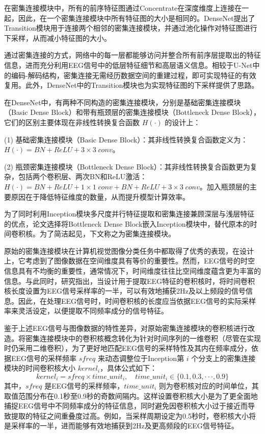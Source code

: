 在密集连接模块中，所有的前序特征图通过Concentrate在深度维度上连接在一起，因此，在一个密集连接模块中所有特征图的大小是相同的。DenseNet提出了Transition模块用于连接两个相邻的密集连接模块，并通过池化操作对特征图进行下采样，从而减小特征图的大小。

通过密集连接的方式，网络中的每一层都能够访问并整合所有前序层提取出的特征信息，进而充分利用EEG信号中的低层特征细节和高层语义信息。相较于U-Net中的编码-解码结构，密集连接无需经历数据空间的重建过程，即可实现特征的有效复用。此外，DenseNet中的Transition模块也为实现特征图的下采样提供了思路。

在DenseNet中，有两种不同构造的密集连接模块，分别是基础密集连接模块（Basic Dense Block）和带有瓶颈层的密集连接模块（Bottleneck Dense Block），它们的区别主要体现在非线性转换复合函数 \(H(·)\) 的设计上：

(1) 基础密集连接模块（Basic Dense Block）：其非线性转换复合函数定义为： \(H(·) = BN + ReLU + 3 \times 3\;conv\)。

(2) 瓶颈密集连接模块（Bottleneck Dense Block）：其非线性转换复合函数更为复杂，包括两个卷积层、两次BN和ReLU激活：\(H(·) = BN + ReLU + 1\times1\;conv + BN + ReLU + 3 \times 3\;conv\)。加入瓶颈层的主要原因在于降低特征维度的数量，从而提升模型计算效率。

为了同时利用Inception模块多尺度并行特征提取和密集连接兼顾深层与浅层特征的优点，论文选择将Bottleneck Dense Block嵌入Inception模块中，替代原本的时间卷积核。为了简洁起见，下文称之为密集连接模块。

原始的密集连接模块在计算机视觉图像分类任务中都取得了优秀的表现，在设计上，它考虑到了图像数据在空间维度具有等价的重要性。然而，EEG信号的时空信息具有不均衡的重要性，通常情况下，时间维度往往比空间维度蕴含更为丰富的信息。与此同时，研究指出\cite{lawhern2018eegnet}，当设计用于提取EEG特征的卷积核时，将时间卷积核长度设置为EEG信号采样率的一半，可以有效地捕获2Hz及以上频段的信号信息。因此，在处理EEG信号时，时间卷积核的长度应当依据EEG信号的实际采样率来灵活设定，以便提取不同频率成分的信号特征。

鉴于上述EEG信号与图像数据的特性差异，对原始密集连接模块的卷积核进行改造。将密集连接模块中的卷积核概念转化为针对时间序列的一维卷积（尽管在实现时仍采用二维卷积），为了更好地匹配EEG信号的采样特性及其内在频率成分，依据EEG信号的采样频率 \(sfreq\) 来动态调整位于Inception第 \(i\) 个分支上的密集连接模块的时间卷积核大小 \(kernel_i\)，具体公式如下：
\begin{equation}
    kernel_i = sfreq \times time\_unit_i, \quad time\_unit_i \in \{0.1, 0.3, ···, 0.9\}
    \label{eq:kernel_cal}
\end{equation}
其中，\(sfreq\) 是EEG信号的采样频率，\(time\_unit_i\)  则为卷积核对应的时间单位，其取值范围分布在0.1秒至0.9秒的奇数间隔内。这样设置卷积核大小是为了更全面地捕捉EEG信号中不同频率成分的特征信息，同时避免因卷积核大小过于接近而导致提取的特征之间重叠度过高。例如，当采样周期设定为0.5秒时，卷积核大小将是采样率的一半，进而能够有效地捕获到2Hz及更高频段的EEG信号特征。

